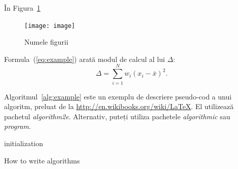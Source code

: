 În Figura~\ref{fig:exemplu} 

\begin{figure}
    \centering
    \texttt{[image: image]}
    \caption{Numele figurii}
    \label{fig:exemplu}
\end{figure}


Formula~(\ref{eq:example}) arată modul de calcul al lui $\Delta$:
\begin{equation} \label{eq:example}
    \Delta =\sum_{i=1}^N w_i (x_i - \bar{x})^2 .
\end{equation}


Algoritmul~\ref{alg:example} este un exemplu de descriere pseudo-cod a unui algoritm, preluat de la \href{http://en.wikibooks.org/wiki/LaTeX/Algorithms#Typesetting_using_the_algorithm2e_package}{http://en.wikibooks.org/wiki/LaTeX}. El utilizează pachetul \textit{algorithm2e}. Alternativ, puteți utiliza pachetele \textit{algorithmic} sau \textit{program}. 

\begin{algorithm}
 initialization\;
 \caption{How to write algorithms}
 \label{alg:example}
\end{algorithm}
